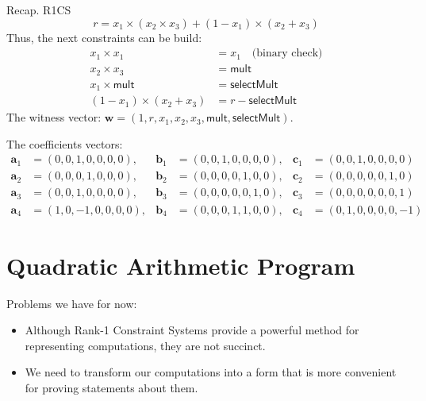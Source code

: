 \documentclass{zkdl-presentation-template}
\begin{document}
    \begin{frame}{Recap. R1CS}
        \vspace{-10pt}
        \begin{equation*}
            r = x_1 \times (x_2 \times x_3) + (1 - x_1) \times (x_2 + x_3)
        \end{equation*}
        \pause
        Thus, the next constraints can be build:
        \vspace{-5pt}
        \begin{align*}
            x_1 \times x_1 &= x_1 \quad \text{(binary check)} \tag{1} \\
            x_2 \times x_3 &= \mathsf{mult} \tag{2} \\
            x_1 \times \mathsf{mult} &= \mathsf{selectMult} \tag{3} \\
            (1 - x_1) \times (x_2 + x_3) &= r - \mathsf{selectMult} \tag{4}
        \end{align*}
        \pause
        The witness vector: $\mathbf{w} = (1, r, x_1, x_2, x_3, \mathsf{mult}, \mathsf{selectMult})$.
        
        \pause
        \vspace{2pt}
        The coefficients vectors:
        \vspace{-25pt}
        {\center\small\begin{align*}
            \mathbf{a}_1 &= (0, 0, 1, 0, 0, 0, 0), & \mathbf{b}_1 &= (0, 0, 1, 0, 0, 0, 0), & \mathbf{c}_1 &= (0, 0, 1, 0, 0, 0, 0) \\
            \mathbf{a}_2 &= (0, 0, 0, 1, 0, 0, 0), & \mathbf{b}_2 &= (0, 0, 0, 0, 1, 0, 0), & \mathbf{c}_2 &= (0, 0, 0, 0, 0, 1, 0) \\
            \mathbf{a}_3 &= (0, 0, 1, 0, 0, 0, 0), & \mathbf{b}_3 &= (0, 0, 0, 0, 0, 1, 0), & \mathbf{c}_3 &= (0, 0, 0, 0, 0, 0, 1) \\
            \mathbf{a}_4 &= (1, 0, -1, 0, 0, 0, 0), & \mathbf{b}_4 &= (0, 0, 0, 1, 1, 0, 0), & \mathbf{c}_4 &= (0, 1, 0, 0, 0, 0, -1)
        \end{align*}}
    \end{frame}
    
    \section{Quadratic Arithmetic Program}

    \begin{frame}
        Problems we have for now: \pause
        \begin{itemize}
            \item Although Rank-1 Constraint Systems provide a powerful method for representing 
            computations, they are not succinct. \pause
            \item We need to transform our computations into a form that is more convenient for 
            proving statements about them.
        \end{itemize}
    \end{frame}
\end{document}
